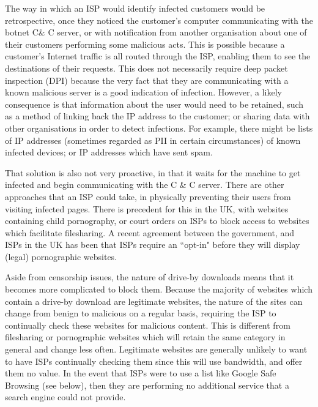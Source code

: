 \documentclass{acm_proc_article-sp}
\begin{document}
The way in which an ISP would identify infected customers would be retrospective, once they noticed the customer's computer communicating with the botnet C\& C server, or with notification from another organisation about one of their customers performing some malicious acts.  This is possible because a customer's Internet traffic is all routed through the ISP, enabling them to see the destinations of their requests.  This does not necessarily require deep packet inspection (DPI) because the very fact that they are communicating with a known malicious server is a good indication of infection.  However, a likely consequence is that information about the user would need to be retained, such as a method of linking back the IP address to the customer; or sharing data with other organisations in order to detect infections.  For example, there might be lists of IP addresses (sometimes regarded as PII in certain circumstances) of known infected devices; or IP addresses which have sent spam.

That solution is also not very proactive, in that it waits for the machine to get infected and begin communicating with the C \& C server.  There are other approaches that an ISP could take, in physically preventing their users from visiting infected pages.  There is precedent for this in the UK, with websites containing child pornography, or court orders on ISPs to block access to websites which facilitate filesharing.  A recent agreement between the government, and ISPs in the UK has been that ISPs require an ``opt-in" before they will display (legal) pornographic websites.  

Aside from censorship issues, the nature of drive-by downloads means that it becomes more complicated to block them.  Because the majority of websites which contain a drive-by download are legitimate websites, the nature of the sites can change from benign to malicious on a regular basis, requiring the ISP to continually check these websites for malicious content.  This is different from filesharing or pornographic websites which will retain the same category in general and change less often.  Legitimate websites are generally unlikely to want to have ISPs continually checking them since this will use bandwidth, and offer them no value.  In the event that ISPs were to use a list like Google Safe Browsing (see below), then they are performing no additional service that a search engine could not provide.
\end{document}
